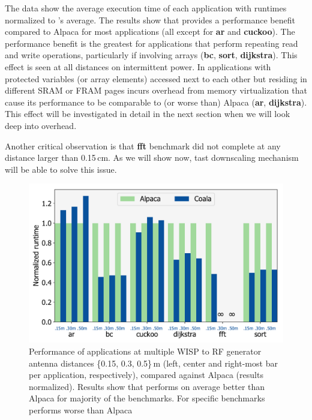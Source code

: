 The data show the average execution time of each application with runtimes normalized to \sys's average.  The results show that \sys provides a performance benefit compared to Alpaca for most applications (all except for \textbf{ar} and \textbf{cuckoo}). The performance benefit is the greatest for applications that perform repeating read and write operations, particularly if involving arrays (\textbf{bc}, \textbf{sort}, \textbf{dijkstra}). This effect is seen at all distances on intermittent power. In applications with protected variables (or array elements) accessed next to each other but residing in different SRAM or FRAM pages \sys incurs overhead from memory virtualization that cause its performance to be comparable to (or worse than) Alpaca (\textbf{ar}, \textbf{dijkstra}). This effect will be investigated in detail in the next section when we will look deep into \sys overhead. 

Another critical observation is that \textbf{fft} benchmark did not complete at any distance larger than 0.15\,cm. As we will show now, \sys tast downscaling mechanism will be able to solve this issue.  

\begin{figure}
	\centering
	\includegraphics[width=\columnwidth]{figures/coala_alpaca_gcc}
	\caption{Performance of \sys applications at multiple WISP to RF generator antenna distances \{0.15, 0.3, 0.5\}\,m (left, center and right-most bar per application, respectively), compared against Alpaca (results normalized). Results show that \sys performs on average better than Alpaca for majority of the benchmarks. For specific benchmarks \sys performs worse than Alpaca }
	\label{fig:runtime}
\end{figure}

